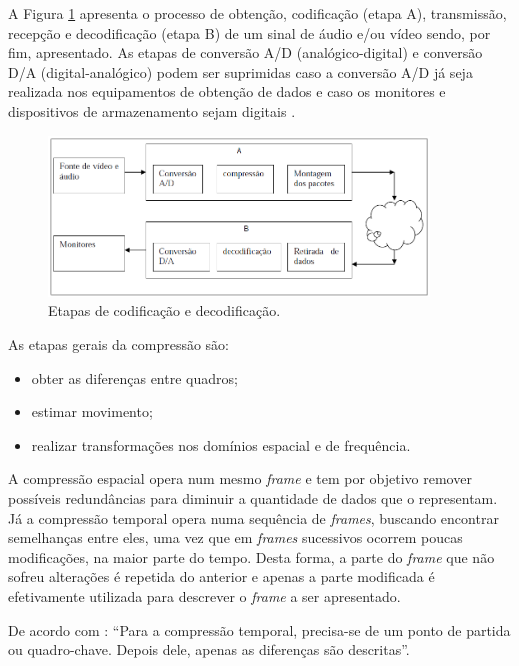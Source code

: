 A Figura \ref{fig:codingprocess} apresenta o processo de obtenção, codificação (etapa A), transmissão, recepção e decodificação (etapa B) de um sinal de áudio e/ou vídeo sendo, por fim, apresentado. As etapas de conversão A/D (analógico-digital) e conversão D/A (digital-analógico) podem ser suprimidas caso a conversão A/D já seja realizada nos equipamentos de obtenção de dados e caso os monitores e dispositivos de armazenamento sejam digitais \cite{rehme}.

\begin{figure}[!htb]
	\centering
	\includegraphics[width=0.9\textwidth]{./imgs/codingprocess.png}
	\caption{Etapas de codificação e decodificação.}
	\label{fig:codingprocess}
\end{figure}

As etapas gerais da compressão são:

\begin{itemize}
	\item obter as diferenças entre quadros;
	\item estimar movimento;
	\item realizar transformações nos domínios espacial e de frequência.
\end{itemize}

A compressão espacial opera num mesmo \emph{frame} e tem por objetivo remover possíveis redundâncias para diminuir a quantidade de dados que o representam. Já a compressão temporal opera numa sequência de \emph{frames}, buscando encontrar semelhanças entre eles, uma vez que em \emph{frames} sucessivos ocorrem poucas modificações, na maior parte do tempo. Desta forma, a parte do \emph{frame} que não sofreu alterações é repetida do anterior e apenas a parte modificada é efetivamente utilizada para descrever o \emph{frame} a ser apresentado.

De acordo com \cite{rehme}: “Para a compressão temporal, precisa-se de um ponto de partida ou quadro-chave. Depois dele, apenas as diferenças são descritas”.

